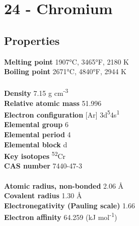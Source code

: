 \section{24 - Chromium}
\label{sec:elem-chromium}
\subsection{Properties}
\textbf{Melting point} 1907°C, 3465°F, 2180 K\\
\textbf{Boiling point} 2671°C, 4840°F, 2944 K\\
\\
\textbf{Density} 7.15 g cm\textsuperscript{-3}\\
\textbf{Relative atomic mass} 51.996\\
\textbf{Electron configuration} [Ar] 3d\textsuperscript{5}4s\textsuperscript{1}\\
\textbf{Elemental group} 6\\
\textbf{Elemental period} 4\\
\textbf{Elemental block} d\\
\textbf{Key isotopes} \textsuperscript{52}Cr\\
\textbf{CAS number} 7440-47-3\\
\\
\textbf{Atomic radius, non-bonded} 2.06 Å\\
\textbf{Covalent radius} 1.30 Å\\
\textbf{Electronegativity (Pauling scale)} 1.66\\
\textbf{Electron affinity} 64.259 (kJ mol\textsuperscript{-1})\\